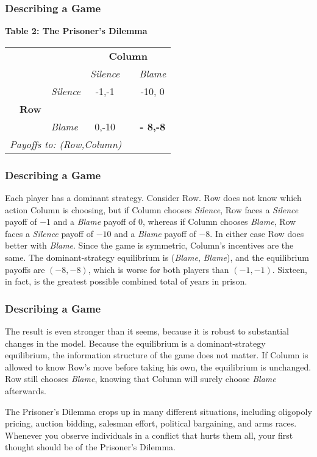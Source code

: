  \begin{frame}[fragile]\frametitle{Describing a Game}
\begin{center}
{\bf Table  2:  The Prisoner's Dilemma}

 \begin{tabular}{lllccc} &       &             &\multicolumn{3}{c}{\bf Column}\\
&       &             &   {\it Silence}  &   & {\it Blame}     \\ &   &  {\it
Silence}      &     -1,-1 &    & -10, 0 \\ & {\bf Row} &&  & &  \\
  &  &       {\it   Blame}     &      0,-10  &    & {\bf - 8,-8} \\
\multicolumn{6}{l}{\it Payoffs to: (Row,Column) } \end{tabular}
\end{center}
\end{frame}

 \begin{frame}[fragile]\frametitle{Describing a Game}
         Each player has a dominant strategy. Consider Row.  Row does not know
which action Column is choosing, but if Column chooses {\it Silence}, Row faces
a {\it Silence} payoff of $-1$ and a {\it Blame} payoff of 0, whereas if Column
chooses {\it Blame}, Row faces a {\it Silence} payoff of $-10$ and a {\it Blame}
payoff of $-8$. In either case Row does better with {\it Blame}. Since the game
is symmetric, Column's incentives are the same. The dominant-strategy
equilibrium is ({\it Blame}, {\it Blame}), and the equilibrium payoffs are
$(-8,-8)$, which is worse for both players than $(-1,-1)$.  Sixteen, in fact, is
the greatest possible combined total of years in prison.
\end{frame}

 \begin{frame}[fragile]\frametitle{Describing a Game}
  The result is even stronger than it seems, because it is robust to substantial
changes in the model.  Because the equilibrium is a dominant-strategy
equilibrium, the information structure of the game does not matter. If Column is
allowed to know Row's move before taking his own, the equilibrium is unchanged.
Row still chooses {\it Blame}, knowing that Column will surely choose {\it
Blame} afterwards.

   The  Prisoner's Dilemma crops up in many different situations, including
oligopoly pricing, auction bidding, salesman effort, political bargaining, and
arms races. Whenever you observe individuals in a conflict that hurts   them
all, your first thought should be of  the   Prisoner's Dilemma.
\end{frame}


